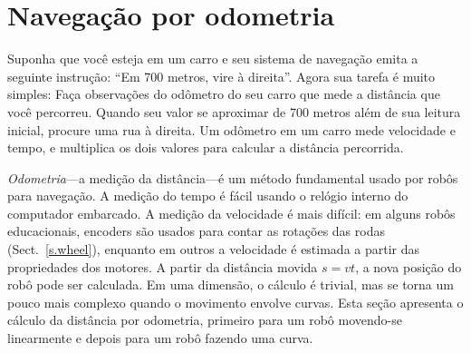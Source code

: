 
\section{Navegação por odometria}\label{s.odometry}

Suponha que você esteja em um carro e seu sistema de navegação emita a seguinte instrução: ``Em 700 metros, vire à direita''. Agora sua tarefa é muito simples: Faça observações do odômetro do seu carro que mede a distância que você percorreu. Quando seu valor se aproximar de 700 metros além de sua leitura inicial, procure uma rua à direita. Um odômetro em um carro mede velocidade e tempo, e multiplica os dois valores para calcular a distância percorrida.

\emph{Odometria}---a medição da distância---é um método fundamental usado por robôs para navegação. A medição do tempo é fácil usando o relógio interno do computador embarcado. A medição da velocidade é mais difícil: em alguns robôs educacionais, encoders são usados para contar as rotações das rodas (Sect.~\ref{s.wheel}), enquanto em outros a velocidade é estimada a partir das propriedades dos motores. A partir da distância movida $s=vt$, a nova posição do robô pode ser calculada. Em uma dimensão, o cálculo é trivial, mas se torna um pouco mais complexo quando o movimento envolve curvas. Esta seção apresenta o cálculo da distância por odometria, primeiro para um robô movendo-se linearmente e depois para um robô fazendo uma curva.

